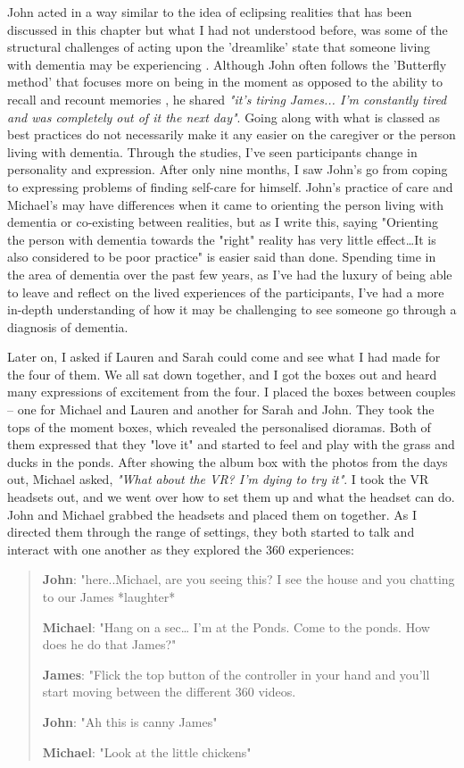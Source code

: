 John acted in a way similar to the idea of eclipsing realities that has been discussed in this chapter but what I had not understood before, was some of the structural challenges of acting upon the 'dreamlike' state that someone living with dementia may be experiencing \citep{bryden_before_2015}. Although John often follows the 'Butterfly method' that focuses more on being in the moment as opposed to the ability to recall and recount memories \citep{hodge_exploring_2019}, he shared \textit{"it's tiring James... I'm constantly tired and was completely out of it the next day"}. Going along with what is classed as best practices do not necessarily make it any easier on the caregiver or the person living with dementia. Through the studies, I've seen participants change in personality and expression. After only nine months, I saw John's go from coping to expressing problems of finding self-care for himself. John's practice of care and Michael's may have differences when it came to orienting the person living with dementia or co-existing between realities, but as I write this, saying "Orienting the person with dementia towards the "right" reality has very little effect…It is also considered to be poor practice" \citep{hodge_exploring_2019} is easier said than done. Spending time in the area of dementia over the past few years, as I've had the luxury of being able to leave and reflect on the lived experiences of the participants, I've had a more in-depth understanding of how it may be challenging to see someone go through a diagnosis of dementia. 

Later on, I asked if Lauren and Sarah could come and see what I had made for the four of them. We all sat down together, and I got the boxes out and heard many expressions of excitement from the four. I placed the boxes between couples – one for Michael and Lauren and another for Sarah and John. They took the tops of the moment boxes, which revealed the personalised dioramas. Both of them expressed that they "love it" and started to feel and play with the grass and ducks in the ponds. After showing the album box with the photos from the days out, Michael asked, \textit{"What about the VR? I'm dying to try it"}. I took the VR headsets out, and we went over how to set them up and what the headset can do. John and Michael grabbed the headsets and placed them on together. As I directed them through the range of settings, they both started to talk and interact with one another as they explored the 360 experiences:

\begin{quote}
    
\textbf{John}: "here..Michael, are you seeing this? I see the house and you chatting to our James *laughter*

\textbf{Michael}: "Hang on a sec… I'm at the Ponds. Come to the ponds. How does he do that James?"

\textbf{James}: "Flick the top button of the controller in your hand and you'll start moving between the different 360 videos.

\textbf{John}: "Ah this is canny James"

\textbf{Michael}: "Look at the little chickens"
\end{quote}

